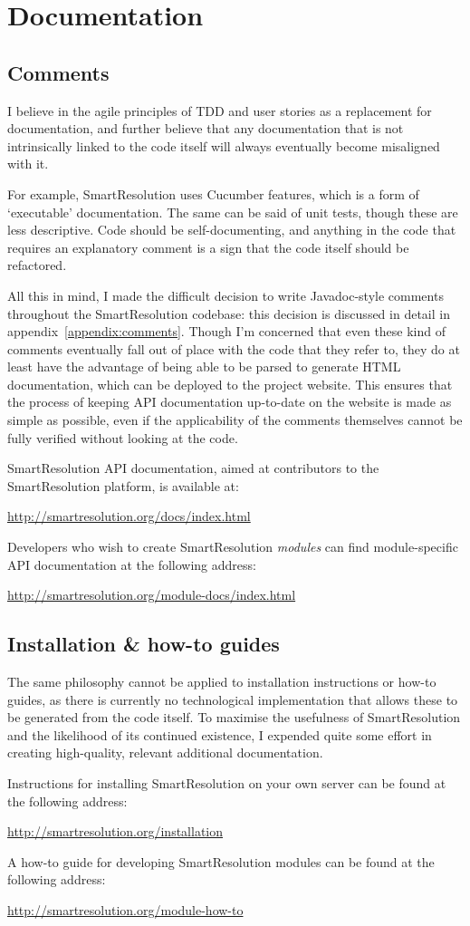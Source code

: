 \section{Documentation}

\subsection{Comments}

I believe in the agile principles of TDD and user stories as a replacement for documentation, and further believe that any documentation that is not intrinsically linked to the code itself will always eventually become misaligned with it.

For example, SmartResolution uses Cucumber features, which is a form of `executable' documentation. The same can be said of unit tests, though these are less descriptive. Code should be self-documenting, and anything in the code that requires an explanatory comment is a sign that the code itself should be refactored.

All this in mind, I made the difficult decision to write Javadoc-style comments throughout the SmartResolution codebase: this decision is discussed in detail in appendix~\ref{appendix:comments}. Though I'm concerned that even these kind of comments eventually fall out of place with the code that they refer to, they do at least have the advantage of being able to be parsed to generate HTML documentation, which can be deployed to the project website. This ensures that the process of keeping API documentation up-to-date on the website is made as simple as possible, even if the applicability of the comments themselves cannot be fully verified without looking at the code.

SmartResolution API documentation, aimed at contributors to the SmartResolution platform, is available at:

\url{http://smartresolution.org/docs/index.html}

Developers who wish to create SmartResolution \emph{modules} can find module-specific API documentation at the following address:

\url{http://smartresolution.org/module-docs/index.html}

\subsection{Installation \& how-to guides}

The same philosophy cannot be applied to installation instructions or how-to guides, as there is currently no technological implementation that allows these to be generated from the code itself. To maximise the usefulness of SmartResolution and the likelihood of its continued existence, I expended quite some effort in creating high-quality, relevant additional documentation.

Instructions for installing SmartResolution on your own server can be found at the following address:

\url{http://smartresolution.org/installation}

A how-to guide for developing SmartResolution modules can be found at the following address:

\url{http://smartresolution.org/module-how-to}